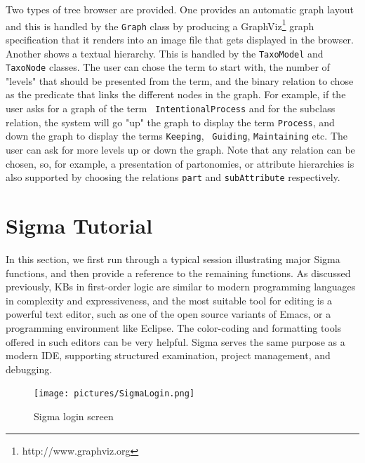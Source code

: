 \documentclass{book}
\begin{document}
Two types of tree browser are provided. One provides an automatic graph layout
and this is handled by the \texttt{Graph} class by
producing a GraphViz\footnote{http://www.graphviz.org} graph specification that
it renders into an image file that gets displayed in the browser. Another shows
a textual hierarchy. This is handled by the
\texttt{TaxoModel} and
\texttt{TaxoNode} classes. The user can chose the term
to start with, the number of "levels" that should be presented from the term,
and the binary relation to chose as the predicate that links the different nodes
in the graph. For example, if the user asks for a graph of the term {\tt
IntentionalProcess} and for the subclass relation, the
system will go "up" the graph to display the term {\tt Process}, and down the
graph to display the terms {\tt Keeping}, {\tt
Guiding}, {\tt Maintaining} etc. The user can
ask for more levels up or down the graph. Note that any relation can be chosen,
so, for example, a presentation of partonomies, or attribute
hierarchies is also supported by choosing the relations {\tt part}
and {\tt subAttribute} respectively.

\section{Sigma Tutorial}
\label{chap:KnowEngi:sec:Tuto}

In this section, we first run through a typical session illustrating major Sigma
functions, and then provide a reference to the remaining functions.  As
discussed previously, KBs in first-order logic are similar to modern programming
languages in complexity and expressiveness, and the most suitable tool for
editing is a powerful text editor, such as one of the open source variants of
Emacs, or a programming environment like Eclipse.
The color-coding and formatting tools offered in such editors can be very
helpful.  Sigma serves the same purpose as a modern IDE, supporting
structured examination, project management, and debugging.

\begin{figure}
  \centering
  \texttt{[image: pictures/SigmaLogin.png]}
  \caption{Sigma login screen}
  \label{fig:SigmaLogin}
\end{figure}
\end{document}
